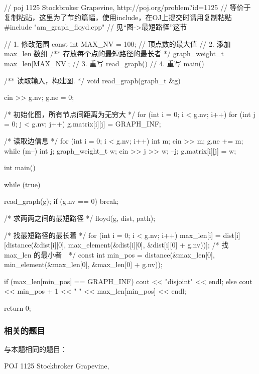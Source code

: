 \begin{Codex}[label=poj_1125.cpp]
    // poj 1125 Stockbroker Grapevine, http://poj.org/problem?id=1125
    // 等价于复制粘贴，这里为了节约篇幅，使用include，在OJ上提交时请用复制粘贴
    #include "am_graph_floyd.cpp"  // 见“图->最短路径”这节

    // 1. 修改范围
    const int MAX_NV = 100; // 顶点数的最大值
    // 2. 添加 max_len 数组
    /** 存放每个点的最短路径的最长者 */
    graph_weight_t max_len[MAX_NV];
    // 3. 重写 read_graph()
    // 4. 重写 main()

    /** 读取输入，构建图. */
    void read_graph(graph_t &g) {
        cin >> g.nv;
        g.ne = 0;

        /* 初始化图，所有节点间距离为无穷大 */
        for (int i = 0; i < g.nv; i++) {
            for (int j = 0; j < g.nv; j++) {
                g.matrix[i][j] = GRAPH_INF;
            }
        }

        /* 读取边信息 */
        for (int i = 0; i < g.nv; i++) {
            int m;
            cin >> m;
            g.ne += m;
            while (m--) {
                int j;
                graph_weight_t w;
                cin >> j >> w;
                --j;
                g.matrix[i][j] = w;
            }
        }
    }

    int main() {
        while (true) {
            read_graph(g);
            if (g.nv == 0) break;

            /* 求两两之间的最短路径 */
            floyd(g, dist, path);

            /* 找最短路径的最长着 */
            for (int i = 0; i < g.nv; i++) {
                max_len[i] = dist[i][distance(&dist[i][0],
                        max_element(&dist[i][0], &dist[i][0] + g.nv))];
            }
            /* 找 max_len 的最小者　*/
            const int min_pos = distance(&max_len[0],
                    min_element(&max_len[0], &max_len[0] + g.nv));

            if (max_len[min_pos] == GRAPH_INF) {
                cout << "disjoint" << endl;
            } else {
                cout << min_pos + 1 << " " << max_len[min_pos] << endl;
            }
        }
        return 0;
    }
\end{Codex}

\subsubsection{相关的题目}
与本题相同的题目：
\begindot
\item POJ 1125 Stockbroker Grapevine, 
\myenddot

